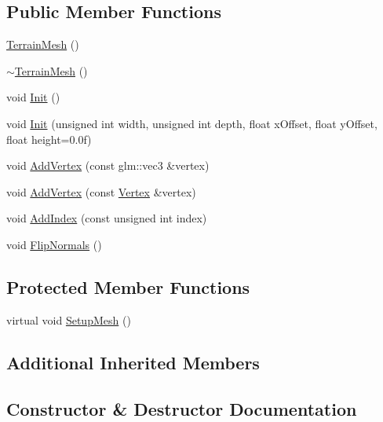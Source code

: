 \subsection*{Public Member Functions}
\begin{DoxyCompactItemize}
\item 
\mbox{\hyperlink{classec_1_1_terrain_mesh_a5947d64e5e4055cc8f9b5bc9077493b7}{Terrain\+Mesh}} ()
\item 
\mbox{\hyperlink{classec_1_1_terrain_mesh_a41755db37e83dfef76a49fed31db0b6e}{$\sim$\+Terrain\+Mesh}} ()
\item 
void \mbox{\hyperlink{classec_1_1_terrain_mesh_ade20b76c5ee3e641e090644305cbee24}{Init}} ()
\item 
void \mbox{\hyperlink{classec_1_1_terrain_mesh_a48250b32fe2a39c9bf7cf17e81adbca6}{Init}} (unsigned int width, unsigned int depth, float x\+Offset, float y\+Offset, float height=0.\+0f)
\item 
void \mbox{\hyperlink{classec_1_1_terrain_mesh_abca61f6ee7a613b6018020d6bddc7c6a}{Add\+Vertex}} (const glm\+::vec3 \&vertex)
\item 
void \mbox{\hyperlink{classec_1_1_terrain_mesh_ab4beedf8241ffca1328c38cc43133986}{Add\+Vertex}} (const \mbox{\hyperlink{structec_1_1_vertex}{Vertex}} \&vertex)
\item 
void \mbox{\hyperlink{classec_1_1_terrain_mesh_a4b96c52654cffbd397ab0335c9e798fe}{Add\+Index}} (const unsigned int index)
\item 
void \mbox{\hyperlink{classec_1_1_terrain_mesh_ad17370144c1139de3967bd54e494de13}{Flip\+Normals}} ()
\end{DoxyCompactItemize}
\subsection*{Protected Member Functions}
\begin{DoxyCompactItemize}
\item 
virtual void \mbox{\hyperlink{classec_1_1_terrain_mesh_a917158d33fbef07ed43ec310f4dbab45}{Setup\+Mesh}} ()
\end{DoxyCompactItemize}
\subsection*{Additional Inherited Members}


\subsection{Constructor \& Destructor Documentation}
\mbox{\label{classec_1_1_terrain_mesh_a5947d64e5e4055cc8f9b5bc9077493b7}} 

